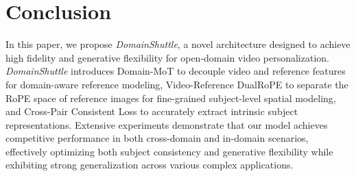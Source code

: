 \section{Conclusion}


In this paper, we propose \textit{DomainShuttle}, a novel architecture designed to achieve high fidelity and generative flexibility for open-domain video personalization. \textit{DomainShuttle} introduces Domain-MoT to decouple video and reference features for domain-aware reference modeling, Video-Reference DualRoPE to separate the RoPE space of reference images for fine-grained subject-level spatial modeling, and Cross-Pair Consistent Loss to accurately extract intrinsic subject representations. Extensive experiments demonstrate that our model achieves competitive performance in both cross-domain and in-domain scenarios, effectively optimizing both subject consistency and generative flexibility while exhibiting strong generalization across various complex applications.